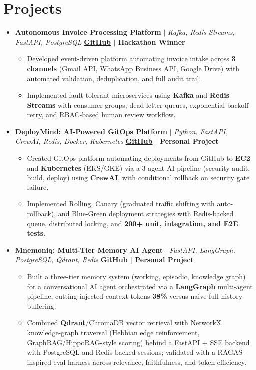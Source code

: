 \documentclass[letterpaper,10pt]{article}
\newcommand{\resumeItem}[1]{\item \small{#1}}
\newcommand{\resumeProjectHeading}[2]{
\item
\small #1 \hfill \textbf{\small #2}
\vspace{-4pt}
}
\begin{document}
\section{Projects}
\begin{itemize}[leftmargin=0in, label={}]

\resumeProjectHeading
{\textbf{Autonomous Invoice Processing Platform} $|$ \emph{Kafka, Redis Streams, FastAPI, PostgreSQL}}{\href{https://github.com/PrathamModi001/apex-invoice-processing}{GitHub} $|$ Hackathon Winner}
\begin{itemize}
\vspace{2pt}
  \resumeItem{Developed event-driven platform automating invoice intake across \textbf{3 channels} (Gmail API, WhatsApp Business API, Google Drive) with automated validation, deduplication, and full audit trail.}
  \resumeItem{Implemented fault-tolerant microservices using \textbf{Kafka} and \textbf{Redis Streams} with consumer groups, dead-letter queues, exponential backoff retry, and RBAC-based human review workflow.}
\end{itemize}

\resumeProjectHeading
{\textbf{DeployMind: AI-Powered GitOps Platform} $|$ \emph{Python, FastAPI, CrewAI, Redis, Docker, Kubernetes}}{\href{https://github.com/PrathamModi001/DeployMind}{GitHub} $|$ Personal Project}
\begin{itemize}
\vspace{2pt}
  \resumeItem{Created GitOps platform automating deployments from GitHub to \textbf{EC2} and \textbf{Kubernetes} (EKS/GKE) via a 3-agent AI pipeline (security audit, build, deploy) using \textbf{CrewAI}, with conditional rollback on security gate failure.}
  \resumeItem{Implemented Rolling, Canary (graduated traffic shifting with auto-rollback), and Blue-Green deployment strategies with Redis-backed queue, distributed locking, and \textbf{200+ unit, integration, and E2E tests}.}
\end{itemize}

\vspace{2pt}

\resumeProjectHeading
{\textbf{Mnemoniq: Multi-Tier Memory AI Agent} $|$ \emph{FastAPI, LangGraph, PostgreSQL, Qdrant, Redis}}{\href{https://github.com/PrathamModi001/Mnemoniq}{GitHub} $|$ Personal Project}
\begin{itemize}
\vspace{2pt}
  \resumeItem{Built a three-tier memory system (working, episodic, knowledge graph) for a conversational AI agent orchestrated via a \textbf{LangGraph} multi-agent pipeline, cutting injected context tokens \textbf{38\%} versus naive full-history buffering.}
  \resumeItem{Combined \textbf{Qdrant}/ChromaDB vector retrieval with NetworkX knowledge-graph traversal (Hebbian edge reinforcement, GraphRAG/HippoRAG-style scoring) behind a FastAPI + SSE backend with PostgreSQL and Redis-backed sessions; validated with a RAGAS-inspired eval harness across relevance, faithfulness, and token efficiency.}
\end{itemize}

\end{itemize}
\end{document}
